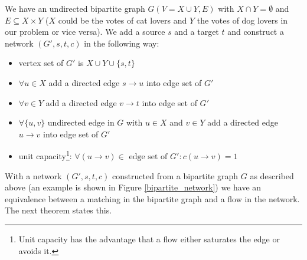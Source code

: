 We have an undirected bipartite graph $G(V = X \cup Y, E)$ with $X \cap Y = \emptyset$ and $E \subseteq X \times Y$ ($X$ could be the votes of cat lovers and $Y$ the votes of dog lovers in our problem or vice versa). We add a source $s$ and a target $t$ and construct a network $(G', s, t, c)$ in the following way:

\begin{itemize}
	\item vertex set of $G'$ is $X \cup Y \cup \{s, t\}$
	\item $\forall u \in X$ add a directed edge $s \rightarrow u$ into edge set of $G'$
	\item $\forall v \in Y$ add a directed edge $v \rightarrow t$ into edge set of $G'$
	\item $\forall \{u, v\}$ undirected edge in $G$ with $u \in X$ and $v \in Y$ add a directed edge $u \rightarrow v$  into edge set of $G'$
	\item unit capacity\footnote{Unit capacity has the advantage that a flow either saturates the edge or avoids it.}: $\forall (u \rightarrow v) \in \text{ edge set of } G': c(u \rightarrow v) = 1$
\end{itemize}

With a network $(G', s, t, c)$ constructed from a bipartite graph $G$ as described above (an example is shown in Figure \ref{bipartite_network}) we have an equivalence between a matching in the bipartite graph and a flow in the network. The next theorem states this.

